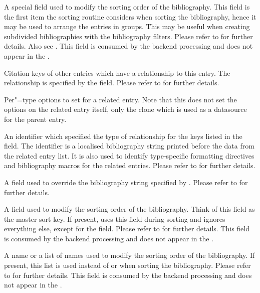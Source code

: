 \documentclass{ltxdockit}[2011/03/25]
\newcommand*{\biblatex}{\sty{biblatex}\xspace}
\begin{document}
\begin{fieldlist}

A special field used to modify the sorting order of the bibliography. This field is the first item the sorting routine considers when sorting the bibliography, hence it may be used to arrange the entries in groups. This may be useful when creating subdivided bibliographies with the bibliography filters. Please refer to  for further details. Also see . This field is consumed by the backend processing and does not appear in the .


Citation keys of other entries which have a relationship to this entry. The relationship is specified by the  field. Please refer to  for further details.


Per"=type options to set for a related entry. Note that this does not set the options on the related entry itself, only the  clone which is used as a datasource for the parent entry.


An identifier which specified the type of relationship for the keys listed in the  field. The identifier is a localised bibliography string printed
before the data from the related entry list. It is also used to identify type-specific
formatting directives and bibliography macros for the related entries. Please refer to  for further details.


A field used to override the bibliography string specified by . Please refer to  for further details.


A field used to modify the sorting order of the bibliography. Think of this field as the master sort key. If present, \biblatex uses this field during sorting and ignores everything else, except for the  field. Please refer to  for further details. This field is consumed by the backend processing and does not appear in the .


A name or a list of names used to modify the sorting order of the bibliography. If present, this list is used instead of  or  when sorting the bibliography. Please refer to  for further details. This field is consumed by the backend processing and does not appear in the .


\end{fieldlist}
\end{document}
